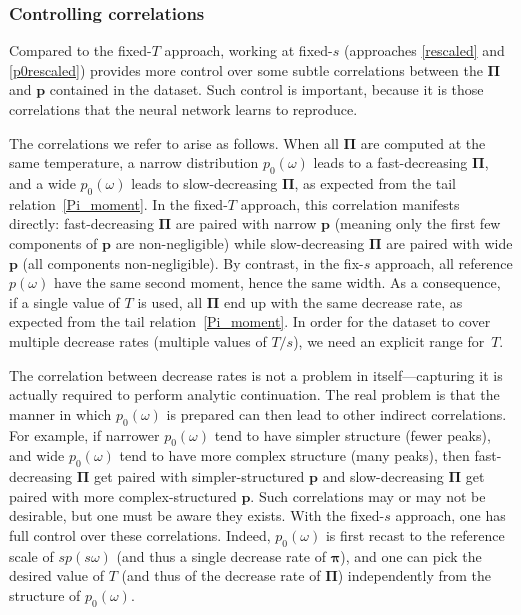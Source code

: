 \documentclass[notitlepage, 11pt, nofootinbib]{revtex4-1}
\renewcommand{\vec}[1]{\bm{#1}}
\begin{document}
\subsubsection{Controlling correlations}
Compared to the fixed-$T$ approach, working at fixed-$s$ (approaches \ref{rescaled} and \ref{p0rescaled}) provides more control over some subtle correlations between the $\vec \Pi$ and $\vec p$ contained in the dataset. Such control is important, because it is those correlations that the neural network learns to reproduce.

The correlations we refer to arise as follows. When all $\vec \Pi$ are computed at the same temperature, a narrow distribution $p_0(\omega)$ leads to a fast-decreasing $\vec \Pi$, and a wide $p_0(\omega)$ leads to slow-decreasing $\vec \Pi$, as expected from the tail relation~\eqref{Pi_moment}.
In the fixed-$T$ approach, this correlation manifests directly: fast-decreasing $\vec \Pi$ are paired with narrow $\vec p$ (meaning only the first few components of $\vec p$ are non-negligible) while slow-decreasing $\vec \Pi$ are paired with wide $\vec p$ (all components non-negligible).
By contrast, in the fix-$s$ approach, all reference $p(\omega)$ have the same second moment, hence the same width. As a consequence, if a single value of $T$ is used, all $\vec \Pi$ end up with the same decrease rate, as expected from the tail relation~\eqref{Pi_moment}. 
In order for the dataset to cover multiple decrease rates (multiple values of $T/s$), we need an explicit range for~$T$.

The correlation between decrease rates is not a problem in itself---capturing it is actually required to perform analytic continuation. The real problem is that the manner in which $p_0(\omega)$ is prepared can then lead to other indirect correlations.
For example, if narrower $p_0(\omega)$ tend to have simpler structure (fewer peaks), and wide $p_0(\omega)$ tend to have more complex structure (many peaks), then fast-decreasing $\vec \Pi$ get paired with simpler-structured $\vec p$ and slow-decreasing $\vec \Pi$ get paired with more complex-structured $\vec p$.
Such correlations may or may not be desirable, but one must be aware they exists.
With the fixed-$s$ approach, one has full control over these correlations. Indeed, $p_0(\omega)$ is first recast to the reference scale of $sp(s\omega)$ (and thus a single decrease rate of $\vec \pi$), and one can pick the desired value of $T$ (and thus of the decrease rate of $\vec \Pi$) independently from the structure of $p_0(\omega)$.
\end{document}
